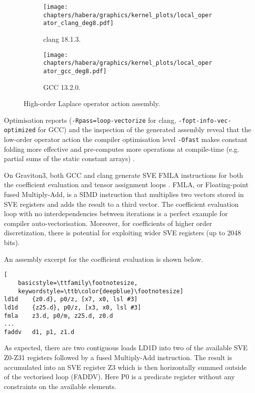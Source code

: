 \begin{figure}
    \begin{subfigure}{.5\textwidth}
        \centering
        \texttt{[image: chapters/habera/graphics/kernel\_plots/local\_operator\_clang\_deg8.pdf]}
        \caption{clang 18.1.3.}
        \label{fig:local-clang-deg8}
    \end{subfigure}%
    \begin{subfigure}{.5\textwidth}
        \centering
        \texttt{[image: chapters/habera/graphics/kernel\_plots/local\_operator\_gcc\_deg8.pdf]}
        \caption{GCC 13.2.0.}
        \label{fig:local-gcc-deg8}
    \end{subfigure}
    \caption{High-order Laplace operator action assembly.}
    \label{fig:local-deg8}
\end{figure}

Optimisation reports (\texttt{-Rpass=loop-vectorize} for clang,
\texttt{-fopt-info-vec-optimized} for GCC) and the inspection of the generated
assembly reveal that the low-order operator action the compiler optimisation
level \lstinline{-Ofast} makes constant folding more effective and pre-computes
more operations at compile-time (e.g. partial sums of the static constant arrays)
\citep{GodboltArmClangDeg1}.

On Graviton3, both GCC and clang generate SVE FMLA instructions
\citep{ArmReferenceManual} for both the coefficient evaluation and tensor
assignment loops \citep{GodboltArmClang,GodboltArmGCC}. FMLA, or Floating-point
fused Multiply-Add, is a SIMD instruction that multiplies two vectors stored in
SVE registers and adds the result to a third vector. The coefficient evaluation
loop with no interdependencies between iterations is a perfect example for
compiler auto-vectorisation. Moreover, for coefficients of higher order
discretization, there is potential for exploiting wider SVE registers (up to
2048 bits).

An assembly excerpt for the coefficient evaluation is shown below.
\begin{lstlisting}[
    basicstyle=\ttfamily\footnotesize,
    keywordstyle=\ttb\color{deepblue}\footnotesize]
ld1d    {z0.d}, p0/z, [x7, x0, lsl #3]
ld1d    {z25.d}, p0/z, [x3, x0, lsl #3]
fmla    z3.d, p0/m, z25.d, z0.d
...
faddv   d1, p1, z1.d
\end{lstlisting}
As expected, there are two contiguous loads LD1D into two of the available SVE
Z0-Z31 registers followed by a fused Multiply-Add instruction. The result is
accumulated into an SVE register Z3 which is then horizontally summed outside
of the vectorised loop (FADDV). Here P0 is a predicate register without any
constraints on the available elements.

